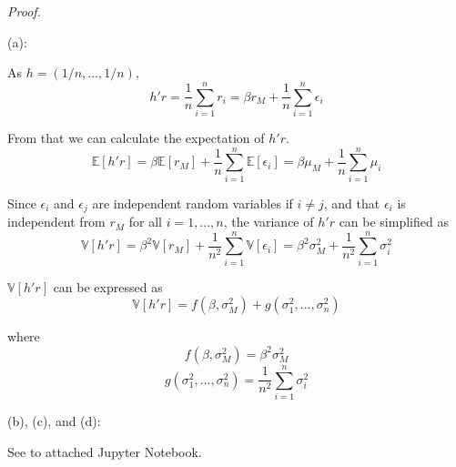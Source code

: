 \documentclass[a4paper]{article}
\begin{document}
\textit{Proof.}\newline

(a):\newline

As $h=(1/n,...,1/n)$,
\[h'r=\frac{1}{n}\sum_{i=1}^n {r_i}=\beta r_M+\frac{1}{n}\sum_{i=1}^n {\epsilon_i}\]

From that we can calculate the expectation of $h'r$.
\[\mathbb{E}[h'r]=\beta\mathbb{E}[r_M]+\frac{1}{n}\sum_{i=1}^n {\mathbb{E}[\epsilon_i]}=\beta\mu_M+\frac{1}{n}\sum_{i=1}^n {\mu_i}\]

Since $\epsilon_i$ and $\epsilon_j$ are independent random variables if $i\neq j$, and that $\epsilon_i$ is independent from $r_M$ for all $i=1,...,n$, the variance of $h'r$ can be simplified as
\[\mathbb{V}[h'r]=\beta^2\mathbb{V}[r_M]+\frac{1}{n^2}\sum_{i=1}^n {\mathbb{V}[\epsilon_i]}=\beta^2\sigma_M^2+\frac{1}{n^2}\sum_{i=1}^n {\sigma_i^2}\]

$\mathbb{V}[h'r]$ can be expressed as
\[\mathbb{V}[h'r]=f(\beta,\sigma_M^2)+g(\sigma_1^2,...,\sigma_n^2)\]

where
\[f(\beta,\sigma_M^2)=\beta^2\sigma_M^2\]
\[g(\sigma_1^2,...,\sigma_n^2)=\frac{1}{n^2}\sum_{i=1}^n {\sigma_i^2}\]

(b), (c), and (d):\newline

See to attached Jupyter Notebook.\newline
\end{document}
